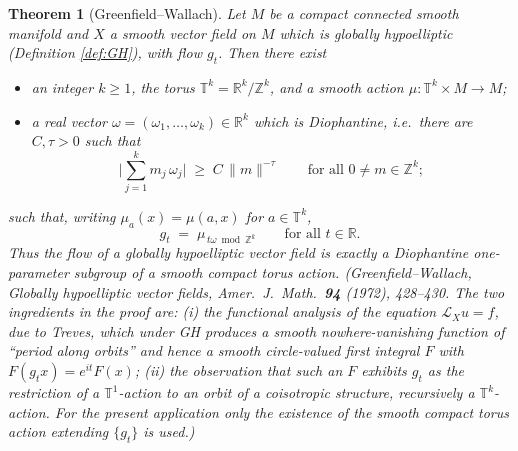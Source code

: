 \documentclass[11pt]{article}
\newtheorem{theorem}{Theorem}[section]
\theoremstyle{definition}
\newcommand{\calL}{\mathcal{L}}
\newcommand{\TT}{\mathbb{T}}
\newcommand{\RR}{\mathbb{R}}
\newcommand{\ZZ}{\mathbb{Z}}
\begin{document}
\begin{theorem}[Greenfield--Wallach]\label{thm:GW}
Let $M$ be a compact connected smooth manifold and $X$ a smooth vector
field on $M$ which is globally hypoelliptic \textup{(}Definition
\ref{def:GH}\textup{)}, with flow $g_t$. Then there exist
\begin{itemize}[leftmargin=2.5em]
  \item an integer $k \ge 1$, the torus $\TT^k = \RR^k / \ZZ^k$, and a
        smooth action $\mu : \TT^k \times M \to M$;
  \item a real vector $\omega = (\omega_1,\dots,\omega_k) \in \RR^k$ which
        is \emph{Diophantine}, i.e.\ there are $C, \tau > 0$ such that
        \[
        \Big|\sum_{j=1}^{k} m_j\,\omega_j\Big|
        \;\ge\; C\,\|m\|^{-\tau}
        \qquad\text{for all } 0 \neq m \in \ZZ^k ;
        \]
\end{itemize}
such that, writing $\mu_a(x) = \mu(a,x)$ for $a \in \TT^k$,
\[
g_t \;=\; \mu_{\,t\omega \bmod \ZZ^k}
\qquad\text{for all } t \in \RR .
\]
Thus the flow of a globally hypoelliptic vector field is exactly a
Diophantine one-parameter subgroup of a smooth compact torus action.
\textup{(}Greenfield--Wallach, \emph{Globally hypoelliptic vector
fields}, Amer.~J.~Math.~\textbf{94} (1972), 428--430. The two ingredients
in the proof are: (i) the functional analysis of the equation
$\calL_X u = f$, due to Treves, which under GH produces a smooth
nowhere-vanishing function of ``period along orbits'' and hence a smooth
circle-valued first integral $F$ with $F(g_t x) = e^{it} F(x)$; (ii) the
observation that such an $F$ exhibits $g_t$ as the restriction of a
$\TT^1$-action to an orbit of a coisotropic structure, recursively a
$\TT^k$-action. For the present application only the \emph{existence of
the smooth compact torus action extending $\{g_t\}$} is
used.\textup{)}
\end{theorem}
\end{document}
